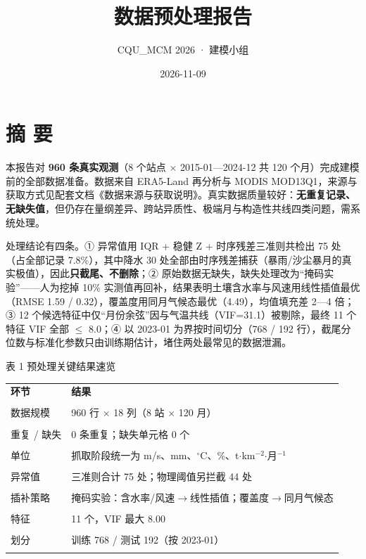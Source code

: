 \documentclass[11pt,a4paper]{ctexart}
\title{数据预处理报告}
\author{CQU\_MCM 2026 · 建模小组}
\date{2026-11-09}
\begin{document}
\maketitle
\thispagestyle{empty}
\newpage

\section*{摘  要}
本报告对 \textbf{960 条真实观测}（8 个站点 $\times$ 2015-01—2024-12 共 120 个月）完成建模前的全部数据准备。数据来自 ERA5-Land 再分析与 MODIS MOD13Q1，来源与获取方式见配套文档《数据来源与获取说明》。真实数据质量较好：\textbf{无重复记录、无缺失值}，但仍存在量纲差异、跨站异质性、极端月与构造性共线四类问题，需系统处理。

处理结论有四条。① 异常值用 IQR + 稳健 Z + 时序残差三准则共检出 75 处（占全部记录 7.8\%），其中降水 30 处全部由时序残差捕获（暴雨/沙尘暴月的真实极值），因此\textbf{只截尾、不删除}；② 原始数据无缺失，缺失处理改为“掩码实验”——人为挖掉 10\% 实测值再回补，结果表明土壤含水率与风速用线性插值最优（RMSE 1.59 / 0.32），覆盖度用同月气候态最优（4.49），均值填充差 2—4 倍；③ 12 个候选特征中仅“月份余弦”因与气温共线（VIF=31.1）被剔除，最终 11 个特征 VIF 全部 $\le$ 8.0；④ 以 2023-01 为界按时间切分（768 / 192 行），截尾分位数与标准化参数只由训练期估计，堵住两处最常见的数据泄漏。

表 1  预处理关键结果速览


\begin{table}[H]\centering\small\setlength{\parskip}{2pt}
\begin{tabularx}{\textwidth}{|X|X|}
\toprule
\textbf{环节} & \textbf{结果} \\\\
\midrule
数据规模 & 960 行 $\times$ 18 列（8 站 $\times$ 120 月） \\\\
重复 / 缺失 & 0 条重复；缺失单元格 0 个 \\\\
单位 & 抓取阶段统一为 m/s、mm、$^{\circ}$C、\%、t$\cdot$km$^{-2}$$\cdot$月$^{-1}$ \\\\
异常值 & 三准则合计 75 处；物理阈值另拦截 44 处 \\\\
插补策略 & 掩码实验：含水率/风速$\to$线性插值；覆盖度$\to$同月气候态 \\\\
特征 & 11 个，VIF 最大 8.00 \\\\
划分 & 训练 768 / 测试 192（按 2023-01） \\\\
\bottomrule
\end{tabularx}
\end{table}
\end{document}
